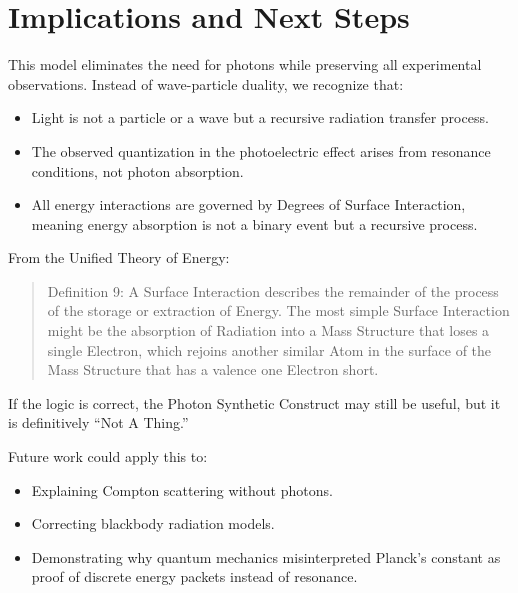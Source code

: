 \documentclass{article}
\begin{document}
\section{Implications and Next Steps}
This model eliminates the need for photons while preserving all experimental observations. Instead of wave-particle duality, we recognize that:
\begin{itemize}
    \item Light is not a particle or a wave but a recursive radiation transfer process.
    \item The observed quantization in the photoelectric effect arises from resonance conditions, not photon absorption.
    \item All energy interactions are governed by Degrees of Surface Interaction, meaning energy absorption is not a binary event but a recursive process.
\end{itemize}

From the Unified Theory of Energy:
\begin{quote}
Definition 9: A Surface Interaction describes the remainder of the process of the storage or extraction of Energy. The most simple Surface Interaction might be the absorption of Radiation into a Mass Structure that loses a single Electron, which rejoins another similar Atom in the surface of the Mass Structure that has a valence one Electron short.
\end{quote}

If the logic is correct, the Photon Synthetic Construct may still be useful, but it is definitively ``Not A Thing.''

Future work could apply this to:
\begin{itemize}
    \item Explaining Compton scattering without photons.
    \item Correcting blackbody radiation models.
    \item Demonstrating why quantum mechanics misinterpreted Planck’s constant as proof of discrete energy packets instead of resonance.
\end{itemize}
\end{document}
